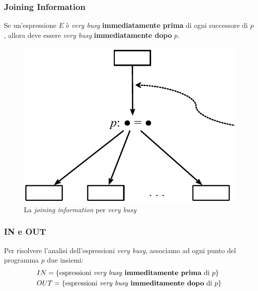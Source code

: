 \subsubsection{Joining Information}
Se un'espressione $E$ \`e \textit{very busy} \textbf{immediatamente prima} di
ogni successore di $p$, allora deve essere \textit{very busy}
\textbf{immediatamente dopo} $p$.

\begin{figure}[H]
  \centering
  \includegraphics[scale=0.4]{res/image/joining_very-busy}
  \caption{La \textit{joining information} per \textit{very busy}}
  \label{img:joining_very-busy}
\end{figure}

\subsubsection{IN e OUT}
Per risolvere l'analisi dell'espressioni \textit{very busy}, associamo ad ogni
punto del programma $p$ due insiemi:
\begin{align*}
& IN = \{
\text{espressioni \textit{very busy} \textbf{immeditamente prima} di $p$}
\} \\
& OUT = \{
\text{espressioni \textit{very busy} \textbf{immeditamente dopo} di $p$}
\}
\end{align*}

